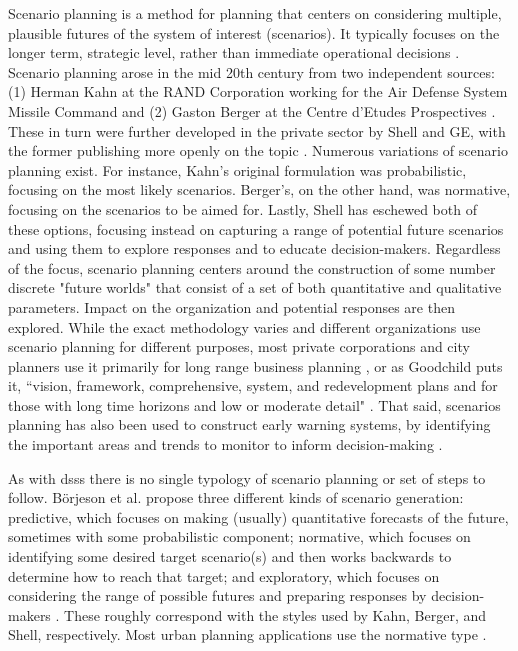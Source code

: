 Scenario planning is a method for planning that centers on considering multiple, plausible futures of the system of interest (scenarios). It typically focuses on the longer term, strategic level, rather than immediate operational decisions \cite{goodspeedScenarioPlanningCities2020}. Scenario planning arose in the mid 20th century from two independent sources: (1) Herman Kahn at the RAND Corporation working for the Air Defense System Missile Command and (2) Gaston Berger at the Centre d'Etudes Prospectives \cite{bradfieldOriginsEvolutionScenario2005}. These in turn were further developed in the private sector by Shell and GE, with the former publishing more openly on the topic \cite{shellplcWhatAreShell2017}. Numerous variations of scenario planning exist. For instance, Kahn's original formulation was probabilistic, focusing on the most likely scenarios. Berger's, on the other hand, was normative, focusing on the scenarios to be aimed for. Lastly, Shell has eschewed both of these options, focusing instead on capturing a range of potential future scenarios and using them to explore responses and to educate decision-makers. Regardless of the focus, scenario planning centers around the construction of some number discrete "future worlds" that consist of a set of both quantitative and qualitative parameters. Impact on the organization and potential responses are then explored. While the exact methodology varies and different organizations use scenario planning for different purposes, most private corporations and city planners use it primarily for long range business planning \cite{bradfieldOriginsEvolutionScenario2005}, or as Goodchild puts it, ``vision, framework, comprehensive, system, and redevelopment plans and for those with long time horizons and low or moderate detail" \cite{goodspeedScenarioPlanningCities2020}. That said, scenarios planning has also been used to construct early warning systems, by identifying the important areas and trends to monitor to inform decision-making \cite{tessunScenarioAnalysisEarly1997}.

As with \acp{dss} there is no single typology of scenario planning or set of steps to follow. Börjeson et al. propose three different kinds of scenario generation: predictive, which focuses on making (usually) quantitative forecasts of the future, sometimes with some probabilistic component; normative, which focuses on identifying some desired target scenario(s) and then works backwards to determine how to reach that target; and exploratory, which focuses on considering the range of possible futures and preparing responses by decision-makers \cite{borjesonScenarioTypesTechniques2006}. These roughly correspond with the styles used by Kahn, Berger, and Shell, respectively. Most urban planning applications use the normative type \cite{avinUsingExploratoryScenarios2020}. 

